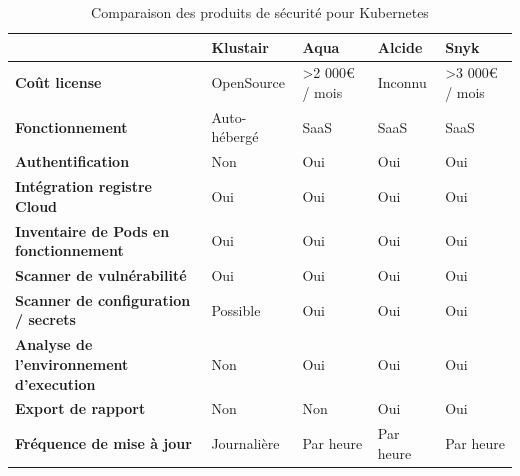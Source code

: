 \begin{table}[h]
    \begin{center}
            \begin{tabular}{p{5cm}|llll}
                                                                & \textbf{Klustair} & \textbf{Aqua}              & \textbf{Alcide} & \textbf{Snyk}              \\
                \toprule
                \textbf{Coût license}                            & OpenSource        & \textgreater 2 000€ / mois & Inconnu         & \textgreater 3 000€ / mois \\
                \hline
                \textbf{Fonctionnement}                          & Auto-hébergé      & SaaS                       & SaaS            & SaaS                       \\
                \hline
                \textbf{Authentification}                        & Non               & Oui                        & Oui             & Oui                        \\
                \hline
                \textbf{Intégration registre Cloud}              & Oui               & Oui                        & Oui             & Oui                        \\
                \hline
                \textbf{Inventaire de Pods en fonctionnement}    & Oui               & Oui                        & Oui             & Oui                        \\
                \hline
                \textbf{Scanner de vulnérabilité}                & Oui               & Oui                        & Oui             & Oui                        \\
                \hline
                \textbf{Scanner de configuration / secrets}      & Possible          & Oui                        & Oui             & Oui                        \\
                \hline
                \textbf{Analyse de l'environnement d'execution}  & Non               & Oui                        & Oui             & Oui                        \\
                \hline
                \textbf{Export de rapport}                       & Non               & Non                        & Oui             & Oui                        \\
                \hline
                \textbf{Fréquence de mise à jour}                & Journalière       & Par heure                  & Par heure       & Par heure                 
            \end{tabular}
            \caption{Comparaison des produits de sécurité pour Kubernetes}
            \label{tab:sectoolscompkub}
    \end{center}
\end{table}

